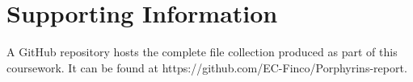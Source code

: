 \documentclass[num-refs]{wiley-article}
\begin{document}
\section*{Supporting Information}
A GitHub repository hosts the complete file collection produced as part of this coursework.
It can be found at https://github.com/EC-Finco/Porphyrins-report.
\printendnotes


\end{document}

